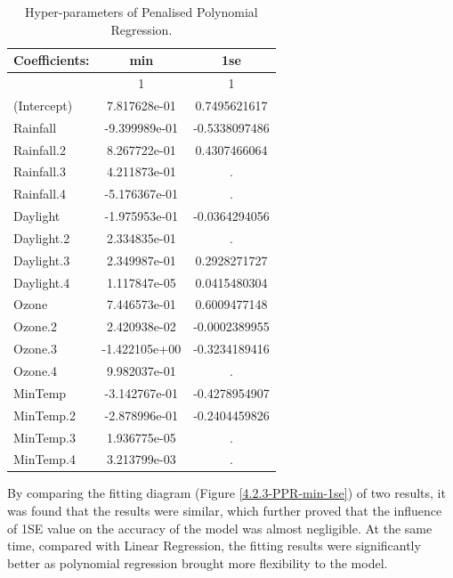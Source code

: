\begin{table}[htbp]
  \centering
  \footnotesize
  \begin{tabular}{p{2cm} | c | c}
  \toprule
  Coefficients: & min & 1se\\ %
  \hline
    & 1 & 1\\
  (Intercept)& 7.817628e-01 & 0.7495621617\\
  Rainfall   & -9.399989e-01 & -0.5338097486\\
  Rainfall.2 &  8.267722e-01 & 0.4307466064\\
  Rainfall.3 &  4.211873e-01 & .\\
  Rainfall.4 & -5.176367e-01 & .\\
  Daylight   & -1.975953e-01 & -0.0364294056\\
  Daylight.2 &  2.334835e-01 & .\\
  Daylight.3 &  2.349987e-01 & 0.2928271727\\
  Daylight.4 &  1.117847e-05 & 0.0415480304\\
  Ozone      &  7.446573e-01 & 0.6009477148\\
  Ozone.2    &  2.420938e-02 & -0.0002389955\\
  Ozone.3    & -1.422105e+00 & -0.3234189416\\
  Ozone.4    &  9.982037e-01 & .\\
  MinTemp    & -3.142767e-01 & -0.4278954907\\
  MinTemp.2  & -2.878996e-01 & -0.2404459826\\
  MinTemp.3  &  1.936775e-05 & .\\
  MinTemp.4  &  3.213799e-03 & .\\
  \bottomrule
  \end{tabular}
  \caption{Hyper-parameters of Penalised Polynomial Regression.}
  \label{4.2.2-PPR-para}
\end{table}



By comparing the fitting diagram (Figure \ref{4.2.3-PPR-min-1se}) of two results, it was found that the results were similar, which further proved that the influence of 1SE value on the accuracy of the model was almost negligible. At the same time, compared with Linear Regression, the fitting results were significantly better as polynomial regression brought more flexibility to the model.

